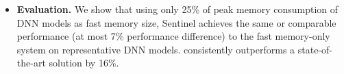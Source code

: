 \begin{itemize}[leftmargin=*]

\item \textbf{Evaluation.} %
We show that using only \textcolor{check}{25\%} of peak memory consumption of DNN models as fast memory size, Sentinel achieves the same or comparable performance (at most \textcolor{check}{7\%} performance difference) to  the fast memory-only system on representative DNN models. \name consistently outperforms a state-of-the-art solution by \textcolor{check}{16\%}.

 
\end{itemize}





\begin{comment}
CPU for machine learning. 

We focus on CPU as the training platform because of following reasons:
(1) The widespread deployment of CPUs makes this hardware platform an attractive target for machine learning model training. 
(2) The optimizations on GPU lack of generality. 
(3) In terms of programmability, porting the original
code to GPU kernels requires significant programming efforts; 
(4) GPU has strong bias towards certain application.
Existing effort has been made in academic and industry to optimize machine learning training on widely available CPU based architecture. Adam~\cite{Chilimbi:2014:PAB:2685048.2685094} from Microsoft. Intel MKL-DNN\cite{intelMKL} has been proposed to accelerate machine learning training. 

\end{comment}